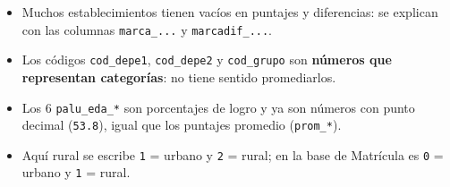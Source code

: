 \documentclass[10.5pt]{article}
\begin{document}
\begin{alertabox}
\begin{itemize}[leftmargin=1.1em,itemsep=2pt,topsep=2pt]
\item Muchos establecimientos tienen vacíos en puntajes y diferencias: se explican con las columnas \texttt{marca\_\allowbreak{}...} y \texttt{marcadif\_\allowbreak{}...}.
\item Los códigos \texttt{cod\_\allowbreak{}depe1}, \texttt{cod\_\allowbreak{}depe2} y \texttt{cod\_\allowbreak{}grupo} son \textbf{números que representan categorías}: no tiene sentido promediarlos.
\item Los 6 \texttt{palu\_\allowbreak{}eda\_\allowbreak{}*} son porcentajes de logro y ya son números con punto decimal (\texttt{53.8}), igual que los puntajes promedio (\texttt{prom\_\allowbreak{}*}).
\item Aquí rural se escribe \texttt{1} = urbano y \texttt{2} = rural; en la base de Matrícula es \texttt{0} = urbano y \texttt{1} = rural.
\end{itemize}
\end{alertabox}

\newpage
{}\label{base4}\hypertarget{base4}{}
\end{document}
